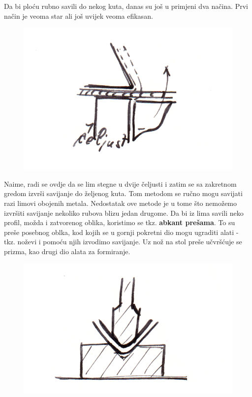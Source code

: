 \documentclass[a4paper,12pt]{article}
\numberwithin{figure}{section}
\begin{document}
\begin{enumerate}
\begin{figure}[!h]
\end{figure}
\FloatBarrier
\end{enumerate}
Da bi ploću rubno savili do nekog kuta, danas su još u primjeni dva načina. Prvi način je veoma star ali još uvijek veoma efikasan.
\begin{figure}[!h]
\centering
\includegraphics[scale=0.15]{image_48-3.png}
\end{figure}
\FloatBarrier
Naime, radi se ovdje da se lim stegne u dvije čeljusti i zatim se sa zakretnom gredom izvrši savijanje do željenog kuta. Tom metodom se ručno mogu savijati razi limovi obojenih metala. Nedostatak ove metode je u tome što nemožemo izvršiti savijanje nekoliko rubova blizu jedan drugome. Da bi iz lima savili neko profil, možda i zatvorenog oblika, koristimo se tkz. \textbf{abkant prešama}. To su preše posebnog oblka, kod kojih se u gornji pokretni dio mogu ugraditi alati - tkz. noževi i pomoću njih izvodimo savijanje. Uz nož na stol preše učvršćuje se prizma, kao drugi dio alata za formiranje. 
\begin{figure}[!h]
\centering
\includegraphics[scale=0.15]{image_49-1.png}
\end{figure}
\end{document}

